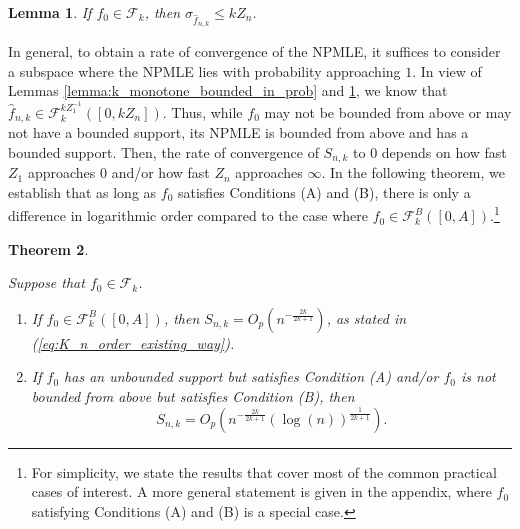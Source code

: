 \documentclass[12pt,letterpaper, twoside, openany]{article}
\theoremstyle{plain}
\newtheorem{theorem}{Theorem}[section]
\newtheorem{lemma}[theorem]{Lemma}
\begin{document}
	
	\begin{lemma}\label{lemma:bounds_on_kmonotone_support}
		If $f_0 \in \mathcal{F}_k$, then   $\sigma_{\hat{f}_{n,k}} \leq k Z_n$.
		\label{lem:kZn}
	\end{lemma}
	
In general, to obtain a rate of convergence of the NPMLE, it suffices to consider a subspace where the NPMLE lies with probability approaching $1$. In view of Lemmas \ref{lemma:k_monotone_bounded_in_prob} and \ref{lemma:bounds_on_kmonotone_support}, we know that $\hat{f}_{n,k} \in \mathcal{F}^{k Z^{-1}_1}_k([0, kZ_n])$. Thus, while $f_0$ may not be bounded from above or may not have a bounded support, its NPMLE is bounded from above and has a bounded support. Then, the rate of convergence of $S_{n,k}$ to $0$ depends on how fast $Z_1$ approaches $0$ and/or how fast $Z_n$ approaches $\infty$. In the following theorem, we establish that as long as $f_0$ satisfies Conditions (A) and (B), there is only a difference in logarithmic order compared to the case where $f_0 \in \mathcal{F}_k^B([0,A])$.\footnote{For simplicity, we state the results that cover most of the common practical cases of interest. A more general statement is given in the appendix, where $f_0$ satisfying Conditions (A) and (B) is a special case.}


	\begin{theorem}\label{thm:simple_k_monotone_logLRT_rate}
		
  Suppose that $f_0 \in \mathcal{F}_k$.
  \begin{enumerate}
      \item[(i)] If $f_0 \in \mathcal{F}_k^B([0,A])$, then $S_{n,k} = O_p\left(n^{-\frac{2k}{2k+1}}\right)$, as stated in (\ref{eq:K_n_order_existing_way}).
      \item[(ii)] If $f_0$ has an unbounded support but satisfies Condition (A) and/or $f_0$ is not bounded from above but satisfies Condition (B), then
      \begin{equation*}
				S_{n,k} 
				= O_p\left(n^{-\frac{2k}{2k+1}} (\log (n) )^{\frac{1}{2k+1}} \right).
			\end{equation*} 
  \end{enumerate}
  
	\end{theorem}
\end{document}
